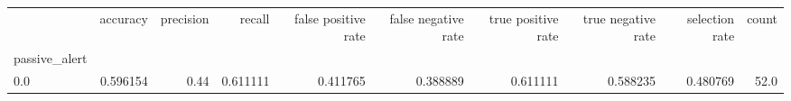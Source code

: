 \begin{tabular}{lrrrrrrrrr}
\toprule
{} &  accuracy &  precision &    recall &  false positive rate &  false negative rate &  true positive rate &  true negative rate &  selection rate &  count \\
passive\_alert &           &            &           &                      &                      &                     &                     &                 &        \\
\midrule
0.0           &  0.596154 &       0.44 &  0.611111 &             0.411765 &             0.388889 &            0.611111 &            0.588235 &        0.480769 &   52.0 \\
\bottomrule
\end{tabular}
